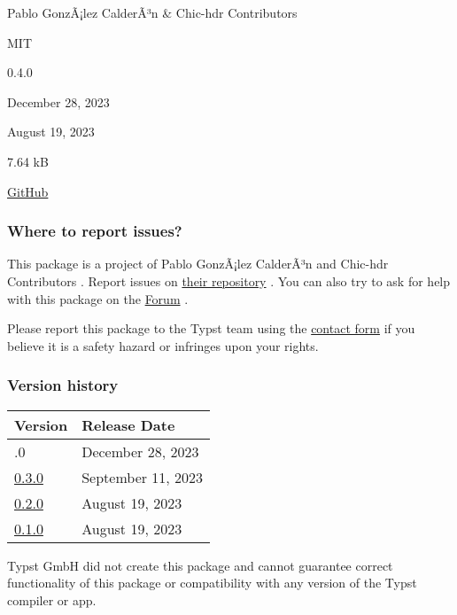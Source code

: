 \begin{description}
\tightlist
\item[Author s :]
Pablo GonzÃ¡lez CalderÃ³n \& Chic-hdr Contributors
\item[License:]
MIT
\item[Current version:]
0.4.0
\item[Last updated:]
December 28, 2023
\item[First released:]
August 19, 2023
\item[Archive size:]
7.64 kB
\href{https://packages.typst.org/preview/chic-hdr-0.4.0.tar.gz}{\pandocbounded{}}
\item[Repository:]
\href{https://github.com/Pablo-Gonzalez-Calderon/chic-header-package}{GitHub}
\end{description}

\subsubsection{Where to report issues?}\label{where-to-report-issues}

This package is a project of Pablo GonzÃ¡lez CalderÃ³n and Chic-hdr
Contributors . Report issues on
\href{https://github.com/Pablo-Gonzalez-Calderon/chic-header-package}{their
repository} . You can also try to ask for help with this package on the
\href{https://forum.typst.app}{Forum} .

Please report this package to the Typst team using the
\href{https://typst.app/contact}{contact form} if you believe it is a
safety hazard or infringes upon your rights.

\label{versions}
\subsubsection{Version history}\label{version-history}

\begin{longtable}[]{@{}ll@{}}
\toprule\noalign{}
Version & Release Date \\
\midrule\noalign{}
\endhead
\bottomrule\noalign{}
\endlastfoot
0.4.0 & December 28, 2023 \\
\href{https://typst.app/universe/package/chic-hdr/0.3.0/}{0.3.0} &
September 11, 2023 \\
\href{https://typst.app/universe/package/chic-hdr/0.2.0/}{0.2.0} &
August 19, 2023 \\
\href{https://typst.app/universe/package/chic-hdr/0.1.0/}{0.1.0} &
August 19, 2023 \\
\end{longtable}

Typst GmbH did not create this package and cannot guarantee correct
functionality of this package or compatibility with any version of the
Typst compiler or app.
